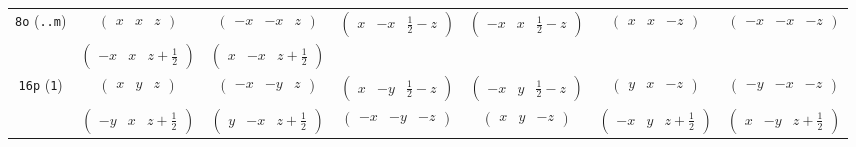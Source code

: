 \documentclass[fleqn,9pt,landscape]{jsarticle}
\begin{document}
\begin{center}
\begin{longtable}{ccccccc}
{\tt 8o} ({\tt ..m}) & $ \begin{pmatrix} x & x & z \end{pmatrix} $ & $ \begin{pmatrix} - x & - x & z \end{pmatrix} $ & $ \begin{pmatrix} x & - x & \frac{1}{2} - z \end{pmatrix} $ & $ \begin{pmatrix} - x & x & \frac{1}{2} - z \end{pmatrix} $ & $ \begin{pmatrix} x & x & - z \end{pmatrix} $ & $ \begin{pmatrix} - x & - x & - z \end{pmatrix} $ \\
& $ \begin{pmatrix} - x & x & z + \frac{1}{2} \end{pmatrix} $ & $ \begin{pmatrix} x & - x & z + \frac{1}{2} \end{pmatrix} $ & $  $ & $  $ & $  $ & $  $ \\ \hline
{\tt 16p} ({\tt 1}) & $ \begin{pmatrix} x & y & z \end{pmatrix} $ & $ \begin{pmatrix} - x & - y & z \end{pmatrix} $ & $ \begin{pmatrix} x & - y & \frac{1}{2} - z \end{pmatrix} $ & $ \begin{pmatrix} - x & y & \frac{1}{2} - z \end{pmatrix} $ & $ \begin{pmatrix} y & x & - z \end{pmatrix} $ & $ \begin{pmatrix} - y & - x & - z \end{pmatrix} $ \\
& $ \begin{pmatrix} - y & x & z + \frac{1}{2} \end{pmatrix} $ & $ \begin{pmatrix} y & - x & z + \frac{1}{2} \end{pmatrix} $ & $ \begin{pmatrix} - x & - y & - z \end{pmatrix} $ & $ \begin{pmatrix} x & y & - z \end{pmatrix} $ & $ \begin{pmatrix} - x & y & z + \frac{1}{2} \end{pmatrix} $ & $ \begin{pmatrix} x & - y & z + \frac{1}{2} \end{pmatrix} $ \\

\end{longtable}
\end{center}
\end{document}
